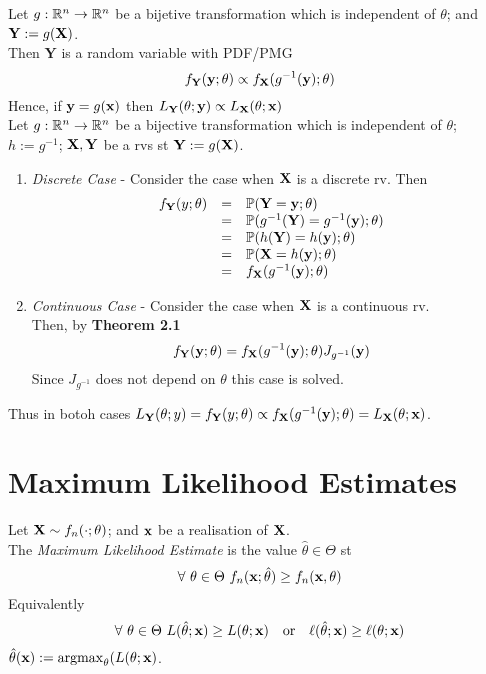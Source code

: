 \documentclass[11pt,a4paper]{article}
\begin{document}
Let $g:\mathbb{R}^n\to\mathbb{R}^n$ be a bijetive transformation which is independent of $\theta$; and $\textbf{Y}:=g(\textbf{X})$.\\
Then $\textbf{Y}$ is a random variable with PDF/PMG
$$f_{\textbf{Y}}(\textbf{y};\theta)\propto f_{\textbf{X}}(g^{-1}(\textbf{y});\theta)$$
Hence, if $\textbf{y}=g(\textbf{x})$ then $L_{\textbf{Y}}(\theta;\textbf{y})\propto L_{\textbf{X}}(\theta;\textbf{x})$\\

Let $g:\mathbb{R}^n\to\mathbb{R}^n$ be a bijective transformation which is independent of $\theta$; $h:=g^{-1}$;  $\textbf{X},\textbf{Y}$ be a rvs st $\textbf{Y}:=g(\textbf{X})$.
\begin{enumerate}[label=\roman*)]
	\item \textit{Discrete Case} - Consider the case when $\textbf{X}$ is a discrete rv. Then
	\[\begin{array}{rcl}
	f_\textbf{Y}(y;\theta)&=&\mathbb{P}(\textbf{Y}=\textbf{y};\theta)\\
	&=&\mathbb{P}(g^{-1}(\textbf{Y})=g^{-1}(\textbf{y});\theta)\\
	&=&\mathbb{P}(h(\textbf{Y})=h(\textbf{y});\theta)\\
	&=&\mathbb{P}(\textbf{X}=h(\textbf{y});\theta)\\
	&=&f_{\textbf{X}}(g^{-1}(\textbf{y});\theta)
	\end{array}\]
	\item \textit{Continuous Case} - Consider the case when $\textbf{X}$ is a continuous rv.\\
	Then, by \textbf{Theorem 2.1}
	$$f_\textbf{Y}(\textbf{y};\theta)=f_{\textbf{X}}(g^{-1}(\textbf{y});\theta)J_{g^{-1}}(\textbf{y})$$
	Since $J_{g^{-1}}$ does not depend on $\theta$ this case is solved.
\end{enumerate}
Thus in botoh cases $L_\textbf{Y}(\theta;y)=f_\textbf{Y}(y;\theta)\propto f_{\textbf{X}}(g^{-1}(\textbf{y});\theta)=L_{\textbf{X}}(\theta;\textbf{x})$.
\proved

\section{Maximum Likelihood Estimates}

Let $\textbf{X}\sim f_n(\cdot;\theta)$; and $\textbf{x}$ be a realisation of $\textbf{X}$.\\
The \textit{Maximum Likelihood Estimate} is the value $\hat{\theta}\in\Theta$ st
$$\forall\ \theta\in\Theta\ f_n(\x;\hat{\theta})\geq f_n(\x,\theta)$$
Equivalently
$$\forall\ \theta\in\Theta\ L(\hat{\theta};\textbf{x})\geq L(\theta;\textbf{x})\quad\mathrm{or}\quad\ell(\hat{\theta};\textbf{x})\geq\ell(\theta;\textbf{x})$$
\ie $\hat{\theta}(\textbf{x}):=\mathrm{argmax}_\theta(L(\theta;\textbf{x})$.\\
\end{document}
